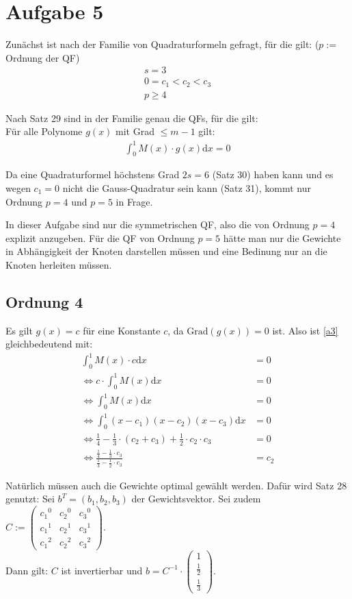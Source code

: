 \section*{Aufgabe 5}

Zunächst ist nach der Familie von Quadraturformeln gefragt, für die gilt: ($p := $ Ordnung der QF)
\begin{align}
	s = 3 \\
	0 = c_1 < c_2 < c_3 \\
	p \ge 4
\end{align}

Nach Satz 29 sind in der Familie genau die QFs, für die gilt: \\
Für alle Polynome $g(x)$ mit Grad $\le m-1$ gilt:
\begin{align}
	 \int_0^1 M(x) \cdot g(x) \mathrm{d}x = 0 \label{a3}
\end{align}

Da eine Quadraturformel höchstens Grad $2s=6$ (Satz 30) haben kann und es wegen
$c_1 = 0$ nicht die Gauss-Quadratur sein kann (Satz 31), kommt nur Ordnung $p=4$
und $p=5$ in Frage.

In dieser Aufgabe sind nur die symmetrischen QF, also die von Ordnung
$p=4$ explizit anzugeben. Für die QF von Ordnung $p=5$ hätte man nur 
die Gewichte in Abhängigkeit der Knoten darstellen müssen und
eine Bedinung nur an die Knoten herleiten müssen.

\subsection*{Ordnung 4}
Es gilt $g(x) = c$ für eine Konstante $c$, da $\text{Grad}(g(x))=0$ ist. 
Also ist \ref{a3} gleichbedeutend mit:
\begin{align}
	 \int_0^1 M(x) \cdot c \mathrm{d}x &= 0 \\
	 \Leftrightarrow c \cdot \int_0^1 M(x) \mathrm{d}x &= 0 \\
 	 \Leftrightarrow \int_0^1 M(x) \mathrm{d}x &= 0 \\
 	 \Leftrightarrow \int_0^1 (x-c_1)(x-c_2)(x-c_3) \mathrm{d}x &= 0 \\
 	 \Leftrightarrow \frac{1}{4} - \frac{1}{3} \cdot (c_2 + c_3) + \frac{1}{2} \cdot c_2 \cdot c_3 &= 0 \\
 	 \Leftrightarrow \frac{\frac{1}{4} - \frac{1}{3} \cdot c_3}
 	                      {\frac{1}{3} - \frac{1}{2} \cdot c_3} &= c_2
\end{align}

Natürlich müssen auch die Gewichte optimal gewählt werden. Dafür wird Satz 28 genutzt:
Sei $b^T = (b_1, b_2, b_3)$ der Gewichtsvektor. Sei zudem $C :=
\begin{pmatrix}
    {c_1}^0 & {c_2}^0 & {c_3}^0 \\
    {c_1}^1 & {c_2}^1 & {c_3}^1 \\
    {c_1}^2 & {c_2}^2 & {c_3}^2
\end{pmatrix}
$. \\
Dann gilt: $C$ ist invertierbar und $b = C^{-1} \cdot
\begin{pmatrix}
    1 \\
    \frac{1}{2} \\
    \frac{1}{3}
\end{pmatrix}
$.

